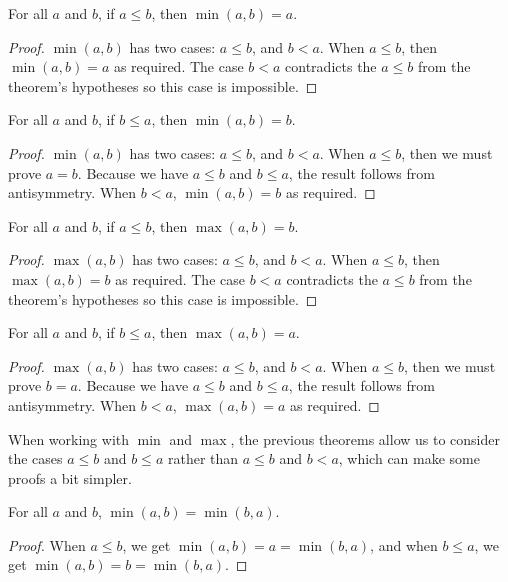 \documentclass[../../math.tex]{subfiles}
\begin{document}
\begin{theorem}
    For all $a$ and $b$, if $a \leq b$, then $\min(a, b) = a$.
\end{theorem}
\begin{proof}
    $\min(a, b)$ has two cases: $a \leq b$, and $b < a$.  When $a \leq b$, then
    $\min(a, b) = a$ as required.  The case $b < a$ contradicts the $a \leq b$
    from the theorem's hypotheses so this case is impossible.
\end{proof}

\begin{theorem}
    For all $a$ and $b$, if $b \leq a$, then $\min(a, b) = b$.
\end{theorem}
\begin{proof}
    $\min(a, b)$ has two cases: $a \leq b$, and $b < a$.  When $a \leq b$, then
    we must prove $a = b$.  Because we have $a \leq b$ and $b \leq a$, the
    result follows from antisymmetry.  When $b < a$, $\min(a, b) = b$ as
    required.
\end{proof}

\begin{theorem}
    For all $a$ and $b$, if $a \leq b$, then $\max(a, b) = b$.
\end{theorem}
\begin{proof}
    $\max(a, b)$ has two cases: $a \leq b$, and $b < a$.  When $a \leq b$, then
    $\max(a, b) = b$ as required.  The case $b < a$ contradicts the $a \leq b$
    from the theorem's hypotheses so this case is impossible.
\end{proof}

\begin{theorem}
    For all $a$ and $b$, if $b \leq a$, then $\max(a, b) = a$.
\end{theorem}
\begin{proof}
    $\max(a, b)$ has two cases: $a \leq b$, and $b < a$.  When $a \leq b$, then
    we must prove $b = a$.  Because we have $a \leq b$ and $b \leq a$, the
    result follows from antisymmetry.  When $b < a$, $\max(a, b) = a$ as
    required.
\end{proof}

When working with $\min$ and $\max$, the previous theorems allow us to consider
the cases $a \leq b$ and $b \leq a$ rather than $a \leq b$ and $b < a$, which
can make some proofs a bit simpler.

\begin{theorem} \label{min_comm}
    For all $a$ and $b$, $\min(a, b) = \min(b, a)$.
\end{theorem}
\begin{proof}
    When $a \leq b$, we get $\min(a, b) = a = \min(b, a)$, and when $b \leq a$,
    we get $\min(a, b) = b = \min(b, a)$.
\end{proof}
\end{document}
